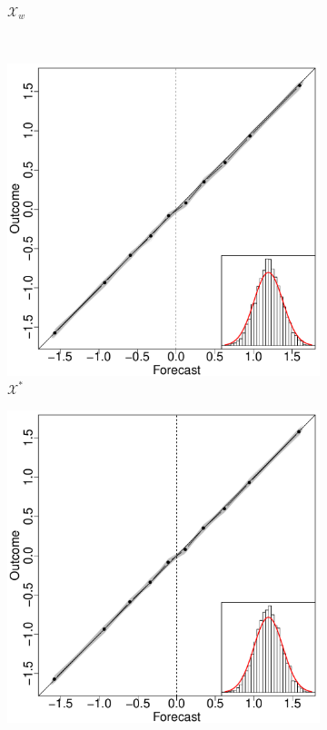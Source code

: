 \documentclass[12pt]{article}
\theoremstyle{definition}
\theoremstyle{definition}
\begin{document}
\begin{figure}[t!]
\begin{subfigure}[b]{0.240\textwidth}
                \caption{$\mathcal{X}_w$}
        \label{RelOWANo}
        \end{subfigure}
        ~ %
        \begin{subfigure}[b]{0.240\textwidth}
                \includegraphics[width=\textwidth]{SimIndepELOP.pdf}
                \caption{$\mathcal{X}^*$ }
        \label{ELOPNoOverlap}
        \end{subfigure}
                \begin{subfigure}[b]{0.240\textwidth}
                \includegraphics[width=\textwidth]{SimIndepOPT.pdf}

\end{subfigure}
\end{figure}
\end{document}

